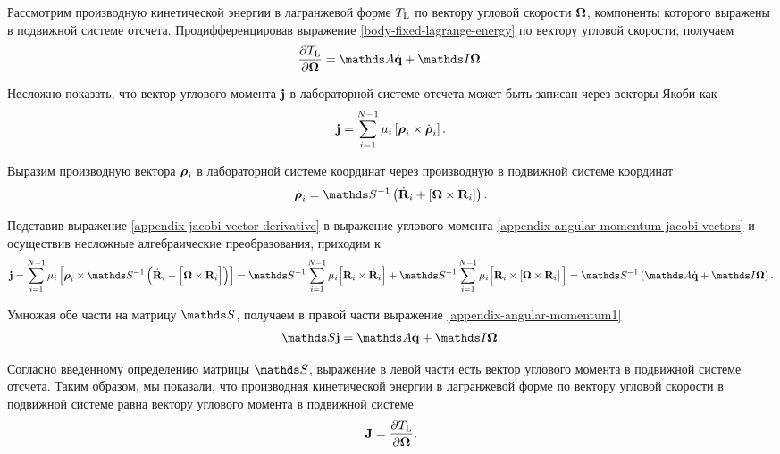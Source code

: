     Рассмотрим производную кинетической энергии в лагранжевой форме $T_\text{L}$ по вектору угловой скорости $\boldsymbol{\Omega}$, компоненты которого выражены в подвижной системе отсчета. Продифференцировав выражение \eqref{body-fixed-lagrange-energy} по вектору угловой скорости, получаем 
    \begin{gather}
        \frac{\partial \Tl}{\partial \bOmega} = \bbA \dot{\mf{q}} + \bbI \bOmega. \label{appendix-angular-momentum1}
    \end{gather}

    Несложно показать, что вектор углового момента $\mathbf{j}$ в лабораторной системе отсчета может быть записан через векторы Якоби как
    \begin{gather}
        \mathbf{j} = \sum_{i = 1}^{N - 1} \mu_i \left[ \boldsymbol{\rho}_i \times \dot{\boldsymbol{\rho}}_i \right]. \label{appendix-angular-momentum-jacobi-vectors}
    \end{gather}

    Выразим производную вектора $\boldsymbol{\rho}_i$ в лабораторной системе координат через производную в подвижной системе координат 
    \begin{gather}
        \dot{\bs{\rho}}_i = \bbS^{-1} \lb \dot{\mf{R}}_i + \lsq \bs{\Omega} \times \mf{R}_i \rsq \rb. \label{appendix-jacobi-vector-derivative} 
    \end{gather}

    Подставив выражение \eqref{appendix-jacobi-vector-derivative} в выражение углового момента \eqref{appendix-angular-momentum-jacobi-vectors} и осуществив несложные алгебраические преобразования, приходим к 
    \begin{gather}
        \mf{j} = \sum_{i = 1}^{N-1} \mu_i \lsq \bs{\rho}_i \times \bbS^{-1} \lb \dot{\mf{R}}_i + \Big[ \bOmega \times \mf{R}_i \Big] \rb \rsq = \bbS^{-1} \sum_{i = 1}^{N-1} \mu_i \Big[ \mf{R}_i \times \dot{\mf{R}}_i \Big] + \bbS^{-1} \sum_{i = 1}^{N-1} \mu_i \Big[ \mf{R}_i \times \lsq \bOmega \times \mf{R}_i \rsq \Big] = \bbS^{-1} \lb \bbA \dot{\mf{q}} + \bbI \bOmega \rb.
    \end{gather}

    Умножая обе части на матрицу $\bbS$, получаем в правой части выражение \eqref{appendix-angular-momentum1}
    \begin{gather}
        \bbS \mf{j} = \bbA \dot{\mf{q}} + \bbI \bOmega.
    \end{gather}

    Согласно введенному определению матрицы $\bbS$, выражение в левой части есть вектор углового момента в подвижной системе отсчета. Таким образом, мы показали, что производная кинетической энергии в лагранжевой форме по вектору угловой скорости в подвижной системе равна вектору углового момента в подвижной системе
    \begin{gather}
        \mathbf{J} = \frac{\partial T_\text{L}}{\partial \boldsymbol{\Omega}}.
    \end{gather}
    
